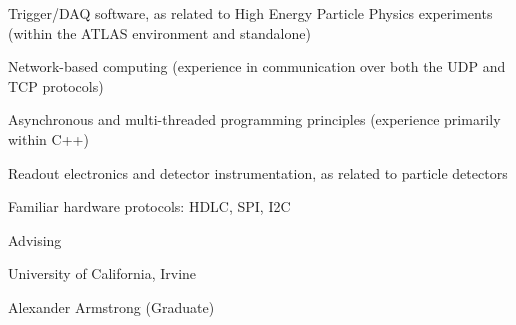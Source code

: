 \begin{minipage}{0.8\textwidth}
\begin{minipage}{\textwidth}
\begin{minipage}{0.8\textwidth}
    \vspace{0.1in}
    \hspace{0.15in}
    \begin{minipage}{\textwidth}
    Trigger/DAQ software, as related to High Energy Particle Physics experiments (within the ATLAS environment and standalone)
    \end{minipage}

    \vspace{0.1in}
    \hspace{0.15in}
    \begin{minipage}{\textwidth}
    Network-based computing (experience in communication over both the UDP and TCP protocols)
    \end{minipage}

    \vspace{0.1in}
    \hspace{0.15in}
    \begin{minipage}{\textwidth}
    Asynchronous and multi-threaded programming principles (experience primarily within C++)
    \end{minipage}

    \vspace{0.1in}
    \hspace{0.15in}
    \begin{minipage}{\textwidth}
    Readout electronics and detector instrumentation, as related to particle detectors
    \end{minipage}

    \vspace{0.1in}
    \hspace{0.15in}
    \begin{minipage}{\textwidth}
    Familiar hardware protocols: HDLC, SPI, I2C
    \end{minipage}



\end{minipage}

\vspace{0.35in}
{\Large Advising}\\
\HRule

\hspace{0.25in}
\begin{minipage}{0.8\textwidth}
	\vspace{0.15in}
	University of California, Irvine

	\hspace{0.15in}
	\begin{minipage}{1.0\textwidth}
		\vspace{0.1in}
		Alexander Armstrong (Graduate)


\end{minipage}
\end{minipage}
\end{minipage}
\end{minipage}
